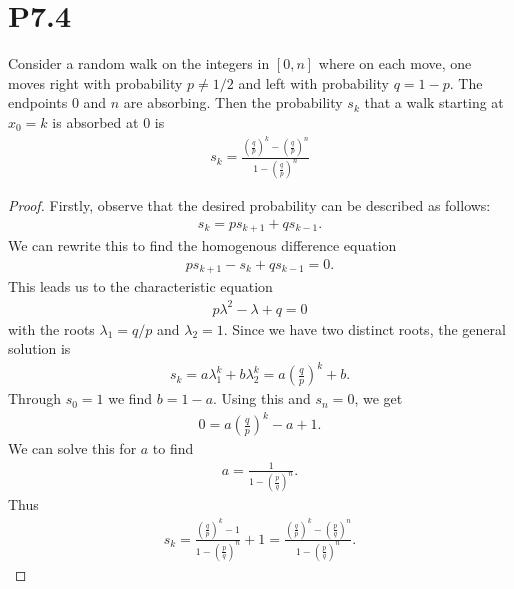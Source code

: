 \documentclass{article}
\begin{document}
\section*{P7.4}


\begin{claim*}
  Consider a random walk on the integers in $[0,n]$ where on each move, one moves right with
  probability $p\not=1/2$ and left with probability $q=1-p$. The endpoints $0$ and $n$ are absorbing.
  Then the probability $s_k$ that a walk starting at $x_0=k$ is absorbed at $0$ is
  \begin{align*}
    s_k = \frac{\left(\frac{q}{p}\right)^k-\left(\frac{q}{p}\right)^n}{1-\left(\frac{q}{p}\right)^n}
  \end{align*}
\end{claim*}
\begin{proof}
  Firstly, observe that the desired probability can be described as follows:
  \begin{align*}
    s_{k} = ps_{k+1} + qs_{k-1}.
  \end{align*}
  We can rewrite this to find the homogenous difference equation
  \begin{align*}
    ps_{k+1} - s_k + qs_{k-1} = 0.
  \end{align*}
  This leads us to the characteristic equation
  \begin{align*}
    p\lambda^2 - \lambda + q = 0
  \end{align*}
  with the roots $\lambda_1 = q/p$ and $\lambda_2 = 1$.
  Since we have two distinct roots, the general solution is
  \begin{align*}
    s_k = a\lambda_1^k + b\lambda_2^k = a\left(\frac{q}{p}\right)^k + b.
  \end{align*}
  Through $s_0=1$ we find $b=1-a$. Using this and $s_n=0$, we get
  \begin{align*}
    0 = a\left(\frac{q}{p}\right)^k - a + 1.
  \end{align*}
  We can solve this for $a$ to find
  \begin{align*}
    a = \frac{1}{1-\left(\frac{p}{q}\right)^n}.
  \end{align*}
  Thus
  \begin{align*}
    s_k =\frac{\left(\frac{q}{p}\right)^k-1}{1-\left(\frac{p}{q}\right)^n}+1
    =\frac{\left(\frac{q}{p}\right)^k-\left(\frac{p}{q}\right)^n}{1-\left(\frac{p}{q}\right)^n}.
  \end{align*}
\end{proof}
\end{document}
